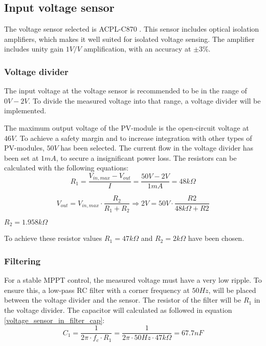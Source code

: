 \subsection{Input voltage sensor} \label{voltage_sensors}
The voltage sensor selected is ACPL-C870 \cite{voltage_sensor}. This sensor includes optical isolation amplifiers, which makes it well suited for isolated voltage sensing. The amplifier includes unity gain $1V/V$ amplification, with an accuracy at $\pm 3 \%$. 

\subsubsection{Voltage divider}
The input voltage at the voltage sensor is recommended to be in the range of $0V-2V$. To divide the measured voltage into that range, a voltage divider will be implemented. 

The maximum output voltage of the PV-module is the open-circuit voltage at $46V$. To achieve a safety margin and to increase integration with other types of PV-modules, $50V$ has been selected. The current flow in the voltage divider has been set at $1mA$, to secure a insignificant power loss. The resistors can be calculated with the following equations:
\begin{equation} \label{voltage_divider_R1_in}
	R_1 = \frac{V_{in,max}-V_{out}}{I} = \frac{50V-2V}{1mA} = 48k\Omega
\end{equation}

\begin{equation} \label{voltage_divider_R2_in}
	V_{out} = V_{in,max} \cdot \frac{R_2}{R_1+R_2} \Rightarrow 2V = 50V \cdot \frac{R2}{48k\Omega+R2}
\end{equation}
\begin{center}
	$R_2 = 1.958k\Omega$
\end{center}

To achieve these resistor values $R_1 = 47k\Omega$ and $R_2 = 2k\Omega$ have been chosen. 

\subsubsection{Filtering} \label{voltage_sensor_filter}
For a stable MPPT control, the measured voltage must have a very low ripple. To ensure this, a low-pass RC filter with a corner frequency at $50Hz$, will be placed between the voltage divider and the sensor. The resistor of the filter will be $R_1$ in the voltage divider. The capacitor will calculated as followed in equation \ref{voltage_sensor_in_filter_cap}:
\begin{equation} \label{voltage_sensor_in_filter_cap}
	C_1 = \frac{1}{2\pi \cdot f_c \cdot R_1} = \frac{1}{2 \pi \cdot 50Hz \cdot 47k\Omega} = 67.7nF
\end{equation}

